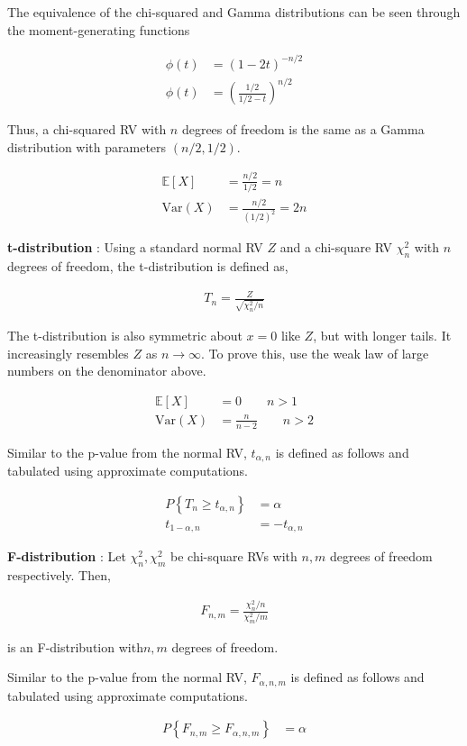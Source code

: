 The equivalence of the chi-squared and Gamma distributions can be seen through the moment-generating functions 

\begin{align}
	\phi(t) &= (1-2t)^{-n/2} \\
	\phi(t) &= \left(\frac{1/2}{1/2 - t}\right)^{n/2} \nonumber
\end{align}

Thus, a chi-squared RV with $ n $ degrees of freedom is the same as a Gamma distribution with parameters $ (n/2, 1/2) $.

\begin{align}
	\mathbb{E}[X] &= \frac{n/2}{1/2} = n \\
	\mathrm{Var}(X) &= \frac{n/2}{(1/2)^2} = 2n
\end{align}

\textbf{t-distribution} : Using a standard normal RV $ Z $ and a chi-square RV $ \chi_n^2 $ with $ n $ degrees of freedom, the t-distribution is defined as,

\begin{align}
	T_n = \frac{Z}{\sqrt{\chi_n^2 / n}}
\end{align}

The t-distribution is also symmetric about $ x=0 $ like $ Z $, but with longer tails. It increasingly resembles $ Z $ as $ n \to \infty $. To prove this, use the weak law of large numbers on the denominator above.

\begin{align}
	\mathbb{E}[X] &= 0 \qquad n>1 \\
	\mathrm{Var}(X) &= \frac{n}{n-2} \qquad n>2
\end{align}

Similar to the p-value from the normal RV, $ t_{\alpha, n} $ is defined as follows and tabulated using approximate computations.

\begin{align}
	P \left\{T_n \geq t_{\alpha, n} \right\} &= \alpha \\
	t_{1-\alpha, n} &= -t_{\alpha, n} \nonumber
\end{align}

\textbf{F-distribution} : Let $ \chi_n^2, \chi_m^2 $ be chi-square RVs with $ n, m $ degrees of freedom respectively. Then,

\begin{align}
	F_{n,m} = \frac{\chi_n^2 / n}{\chi_m^2 / m}
\end{align}

is an F-distribution with$ n,m $ degrees of freedom.

Similar to the p-value from the normal RV, $ F_{\alpha, n, m} $ is defined as follows and tabulated using approximate computations.

\begin{align}
	P \left\{F_{n,m} \geq F_{\alpha, n, m} \right\} &= \alpha \\
\end{align}

\newpage

